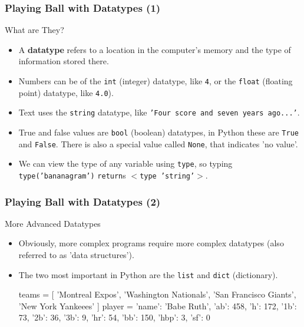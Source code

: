 \documentclass[10pt]{beamer}
\begin{document}
\begin{frame}
  \frametitle{Playing Ball with Datatypes (1)}
  \begin{block}{What are They?}
    \begin{itemize}
      \item A \textbf{datatype} refers to a location in the computer's memory and the type of information stored there.
      \item Numbers can be of the \texttt{int} (integer) datatype, like \texttt{4}, or the \texttt{float} (floating point) datatype, like \texttt{4.0}).
      \item Text uses the \texttt{string} datatype, like \texttt{'Four score and seven years ago...'}.
      \item True and false values are \texttt{bool} (boolean) datatypes, in Python these are \texttt{True} and \texttt{False}.
        There is also a special value called \texttt{None}, that indicates 'no value'.
      \item We can view the type of any variable using \texttt{type}, so typing \texttt{type('bananagram')}  \texttt{return}s \texttt{$<$type 'string'$>$}.
    \end{itemize}
  \end{block}
\end{frame}

\begin{frame}[fragile]
  \frametitle{Playing Ball with Datatypes (2)}
  \begin{block}{More Advanced Datatypes}
    \begin{itemize}
      \item Obviously, more complex programs require more complex datatypes (also referred to as 'data structures').
      \item The two most important in Python are the \texttt{list} and \texttt{dict} (dictionary).
        \begin{pythoncode}
  teams = [
    'Montreal Expos', 'Washington Nationals',
    'San Francisco Giants', 'New York Yankeees'
  ]
  player = {
    'name': 'Babe Ruth', 'ab': 458, 'h': 172,
    '1b': 73, '2b': 36, '3b': 9, 'hr': 54,
    'bb': 150, 'hbp': 3, 'sf': 0
  }
        \end{pythoncode}
    \end{itemize}
  \end{block}
\end{frame}
\end{document}
